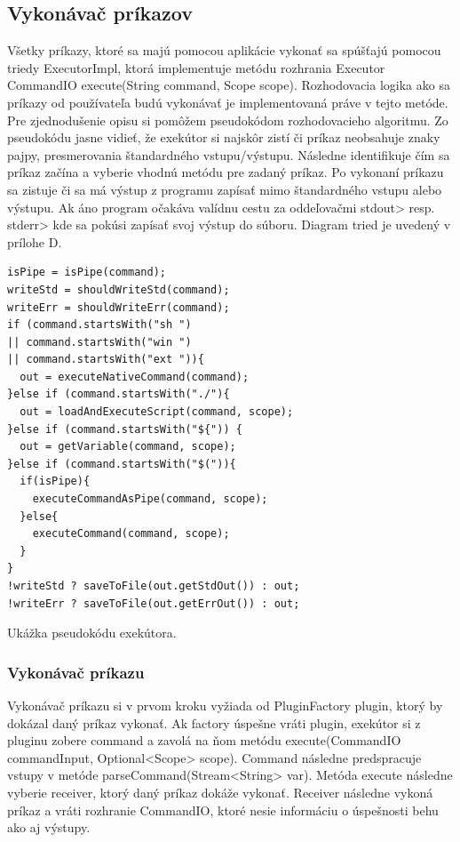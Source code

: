 \subsection{Vykonávač príkazov}
\indent Všetky príkazy, ktoré sa majú pomocou aplikácie vykonať sa spúšťajú pomocou triedy ExecutorImpl, ktorá implementuje metódu rozhrania Executor CommandIO execute(String command, Scope scope). Rozhodovacia logika ako sa príkazy od používateľa budú vykonávať je implementovaná práve v tejto metóde. Pre zjednodušenie opisu si pomôžem pseudokódom rozhodovacieho algoritmu. Zo pseudokódu jasne vidieť, že exekútor si najskôr zistí či príkaz neobsahuje znaky pajpy, presmerovania štandardného vstupu/výstupu. Následne identifikuje čím sa príkaz začína a vyberie vhodnú metódu pre zadaný príkaz. Po vykonaní príkazu sa zistuje či sa má výstup z programu zapísať mimo štandardného vstupu alebo výstupu. Ak áno program očakáva valídnu cestu za oddeľovačmi stdout> \acrshort{resp.} stderr> kde sa pokúsi zapísať svoj výstup do súboru. Diagram tried je uvedený v prílohe D.
\begin{algorithm}[H]
	\begin{verbatim}
isPipe = isPipe(command);
writeStd = shouldWriteStd(command);
writeErr = shouldWriteErr(command);
if (command.startsWith("sh ") 
|| command.startsWith("win ") 
|| command.startsWith("ext ")){
  out = executeNativeCommand(command);
}else if (command.startsWith("./"){
  out = loadAndExecuteScript(command, scope);
}else if (command.startsWith("${")) {
  out = getVariable(command, scope);
}else if (command.startsWith("$(")){
  if(isPipe){
    executeCommandAsPipe(command, scope);
  }else{
    executeCommand(command, scope);
  }
}
!writeStd ? saveToFile(out.getStdOut()) : out;
!writeErr ? saveToFile(out.getErrOut()) : out;
	\end{verbatim}
	\caption{Ukážka pseudokódu exekútora. }
	\label{alg:gen}
\end{algorithm}
\newpage
\subsubsection{Vykonávač príkazu}
\indent Vykonávač príkazu si v prvom kroku vyžiada od PluginFactory plugin, ktorý by dokázal daný príkaz vykonať. Ak factory úspešne vráti plugin, exekútor si z pluginu zobere command a zavolá na ňom metódu execute(CommandIO commandInput, Optional<Scope> scope). Command následne predspracuje vstupy v metóde parseCommand(Stream<String> var). Metóda execute následne vyberie receiver, ktorý daný príkaz dokáže vykonať. Receiver následne vykoná príkaz a vráti rozhranie CommandIO, ktoré nesie informáciu o úspešnosti behu ako aj výstupy.

